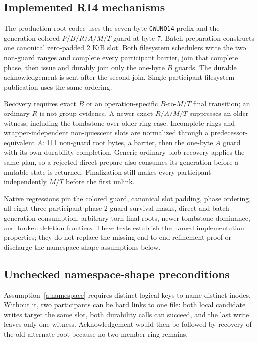 \documentclass[10pt,twocolumn]{article}
\theoremstyle{remark}
\newcommand{\code}[1]{\texttt{#1}}
\begin{document}
\subsection{Implemented R14 mechanisms}

The production root codec uses the seven-byte \code{CWUNO14} prefix and the generation-colored
$P/B/R/A/M/T$ guard at byte 7. Batch preparation constructs one canonical zero-padded 2 KiB slot.
Both filesystem schedulers write the two non-guard ranges and complete every participant barrier,
join that complete phase, then issue and durably join only the one-byte $B$ guards. The durable
acknowledgement is sent after the second join. Single-participant filesystem publication uses the
same ordering.

Recovery requires exact $B$ or an operation-specific $B$-to-$M/T$ final transition; an ordinary
$R$ is not group evidence. A newer exact $R/A/M/T$ suppresses an older witness, including the
tombstone-over-older-ring case. Incomplete rings and wrapper-independent non-quiescent slots are
normalized through a predecessor-equivalent $A$: 111 non-guard root bytes, a barrier, then the
one-byte $A$ guard with its own durability completion. Generic ordinary-blob recovery applies the
same plan, so a rejected direct prepare also consumes its generation before a mutable state is
returned. Finalization still makes every participant independently $M/T$ before the first unlink.

Native regressions pin the colored guard, canonical slot padding, phase ordering, all eight
three-participant phase-2 guard-survival masks, direct and batch generation consumption, arbitrary
torn final roots, newer-tombstone dominance, and broken deletion frontiers. These tests establish
the named implementation properties; they do not replace the missing end-to-end refinement proof
or discharge the namespace-shape assumptions below.

\subsection{Unchecked namespace-shape preconditions}

Assumption~\ref{a:namespace} requires distinct logical keys to name distinct inodes. Without it,
two participants can be hard links to one file: both local candidate writes target the same slot,
both durability calls can succeed, and the last write leaves only one witness. Acknowledgement
would then be followed by recovery of the old alternate root because no two-member ring remains.
\end{document}
